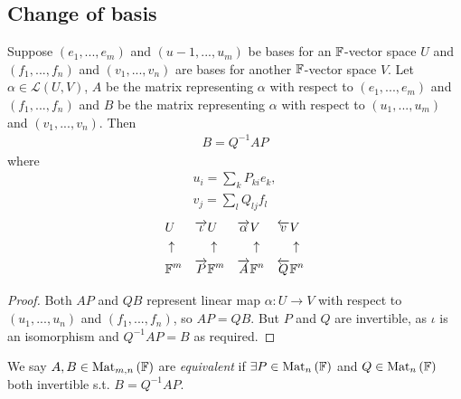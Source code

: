 \documentclass[a4paper]{article}
\begin{document}
\subsection{Change of basis}
\begin{thm}
Suppose $\left(e_1,...,e_m\right)$ and $\left(u-1,...,u_m\right)$ be bases for an $\mathbb{F}$-vector space $U$ and $\left(f_1,...,f_n\right)$ and $\left(v_1,...,v_n\right)$ are bases for another $\mathbb{F}$-vector space $V$. Let $\alpha\in\mathcal{L}\left(U,V\right)$, $A$ be the matrix representing $\alpha$ with respect to $\left(e_1,...,e_m\right)$ and $\left(f_1,...,f_n\right)$ and $B$ be the matrix representing $\alpha$ with respect to $\left(u_1,...,u_m\right)$ and $\left(v_1,...,v_n\right)$. Then
\begin{equation*}
\begin{aligned}
B=Q^{-1}AP
\end{aligned}
\end{equation*}
where
\begin{equation*}
\begin{aligned}
u_i = \sum_k P_{ki}e_k,\\
v_j = \sum_l Q_{lj}f_l
\end{aligned}
\end{equation*}
\begin{equation*}
\begin{aligned}
&U &\overrightarrow{\iota} &U &\overrightarrow{\alpha} &V &\overleftarrow{v} & V\\
&\uparrow & &\uparrow & &\uparrow & &\uparrow\\
&\mathbb{F}^m &\overrightarrow{P} &\mathbb{F}^m &\overrightarrow{A} & \mathbb{F}^n & \overleftarrow{Q} &\mathbb{F}^n
\end{aligned}
\end{equation*}
\begin{proof}
Both $AP$ and $QB$ represent linear map $\alpha: U \to V$ with respect to $\left(u_1,...,u_n\right)$ and $\left(f_1,...,f_n\right)$, so $AP = QB$. But $P$ and $Q$ are invertible, as $\iota$ is an isomorphism and $Q^{-1}AP = B$ as required.
\end{proof}
\end{thm}

\begin{defi}
We say $A,B \in \operatorname{Mat}_{m,n} \left(\mathbb{F}\right)$ are \emph{equivalent} if $\exists P \in \operatorname{Mat}_n \left(\mathbb{F}\right)$ and $Q \in \operatorname{Mat}_n \left(\mathbb{F}\right)$ both invertible s.t. $B=Q^{-1}AP$.
\end{defi}
\end{document}
